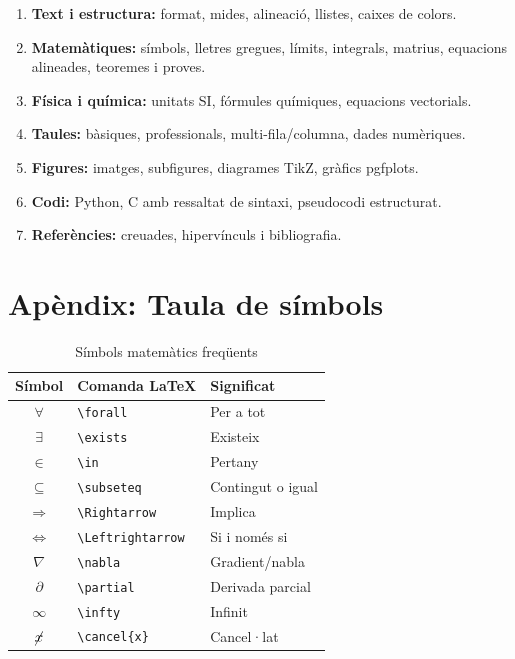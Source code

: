 \documentclass[informe, catalan]{practicaitic}
\theoremstyle{definition}
\theoremstyle{remark}
\begin{document}
\begin{enumerate}
  \item \textbf{Text i estructura:} format, mides, alineació, llistes, caixes de colors.
  \item \textbf{Matemàtiques:} símbols, lletres gregues, límits, integrals, matrius,
        equacions alineades, teoremes i proves.
  \item \textbf{Física i química:} unitats SI, fórmules químiques, equacions vectorials.
  \item \textbf{Taules:} bàsiques, professionals, multi-fila/columna, dades numèriques.
  \item \textbf{Figures:} imatges, subfigures, diagrames TikZ, gràfics pgfplots.
  \item \textbf{Codi:} Python, C amb ressaltat de sintaxi, pseudocodi estructurat.
  \item \textbf{Referències:} creuades, hipervínculs i bibliografia.
\end{enumerate}


\appendix
\section{Apèndix: Taula de símbols}

\begin{table}[H]
\centering
\begin{tabular}{cll}
  \toprule
  \textbf{Símbol} & \textbf{Comanda LaTeX} & \textbf{Significat} \\
  \midrule
  $\forall$          & \texttt{\textbackslash forall}   & Per a tot \\
  $\exists$          & \texttt{\textbackslash exists}   & Existeix \\
  $\in$              & \texttt{\textbackslash in}       & Pertany \\
  $\subseteq$        & \texttt{\textbackslash subseteq} & Contingut o igual \\
  $\Rightarrow$      & \texttt{\textbackslash Rightarrow} & Implica \\
  $\Leftrightarrow$  & \texttt{\textbackslash Leftrightarrow} & Si i només si \\
  $\nabla$           & \texttt{\textbackslash nabla}   & Gradient/nabla \\
  $\partial$         & \texttt{\textbackslash partial} & Derivada parcial \\
  $\infty$           & \texttt{\textbackslash infty}   & Infinit \\
  $\cancel{x}$       & \texttt{\textbackslash cancel\{x\}} & Cancel·lat \\
  \bottomrule
\end{tabular}
\caption{Símbols matemàtics freqüents}
\end{table}
\end{document}
